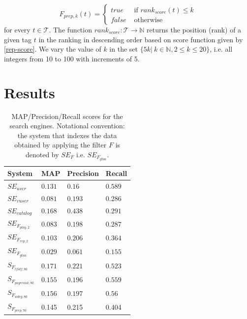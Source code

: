 \begin{equation}
F_{prep,k}(t) = \left\{ 
	\begin{array}{rl}
	true &\mbox{ if $rank_{score}(t) \leq k$} \\
	false &\mbox{ otherwise}
	\end{array}
\right.
\end{equation}
for every $t \in \mathcal{T}$. The function $rank_{score}: \mathcal{T} \rightarrow \mathbb{N}$ returns the  position (rank) of a given tag $t$ in the ranking in descending order based on score function given by \ref{rep-score}. We vary the value of $k$ in the set $\{5k|~k\in \mathbb{N}, 2 \leq k \leq 20\}$, i.e. all integers from 10 to 100 with increments of 5.


\section{Results}\label{filter:sec:res}
\begin{table}[tb]
\centering
\begin{footnotesize}
\begin{tabular}{l|l|l|l}
\toprule
System & MAP & Precision & Recall \\
\hline
$SE_{user}$ & $0.131$ & $0.16$ & $0.589$ \\
\hline
$SE_{vuser}$ & $0.081$ & $0.193$ & $0.286$ \\
\hline
$SE_{catalog}$ & $0.168$ & $0.438$ &	$0.291$ \\
\hline
$SE_{F_{play,2}}$ & $0.083$ & $0.198$ & $0.287$ \\
\hline
$SE_{F_{rep,2}}$ & $0.103$ & $0.206$ & $0.364$ \\
\hline
$SE_{F_{gtaa}}$ & $0.029$ & $0.061$ & $0.155	$ \\
\hline
$S_{F_{tfidf,80}}$ & $0.171$ & $0.221$ & $0.523$ \\
\hline
$S_{F_{pagerank,80}}$ & $0.155$ & $0.196$ & $0.559$ \\
\hline
$S_{F_{wdeg,80}}$ & $0.156$ & $0.197$ & $0.56$ \\
\hline
$S_{F_{prep,70}}$ & 0.145& 0.215& 0.404\\
\bottomrule
\end{tabular}
\caption{MAP/Precision/Recall scores for the search engines. Notational convention: the system that indexes the data obtained by applying the filter $F$ is denoted by $SE_F$ i.e. $SE_{F_{gtaa}}$.}
\label{filter:table:map-prec-rec}
\end{footnotesize}
\end{table}

